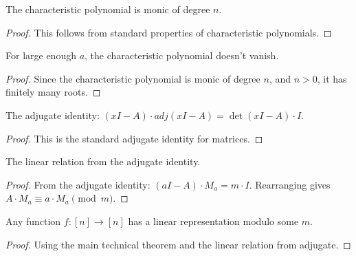 \begin{lemma}
\leanok
The characteristic polynomial is monic of degree $n$.
\end{lemma}

\begin{proof}
This follows from standard properties of characteristic polynomials.
\end{proof}

\begin{lemma}
For large enough $a$, the characteristic polynomial doesn't vanish.
\end{lemma}

\begin{proof}
Since the characteristic polynomial is monic of degree $n$, and $n > 0$, it has finitely many roots.
\end{proof}

\begin{lemma}
The adjugate identity: $(xI - A) \cdot adj(xI - A) = \det(xI - A) \cdot I$.
\end{lemma}

\begin{proof}
This is the standard adjugate identity for matrices.
\end{proof}

\begin{lemma}
The linear relation from the adjugate identity.
\end{lemma}

\begin{proof}
From the adjugate identity: $(aI - A) \cdot M_a = m \cdot I$.
Rearranging gives $A \cdot M_a \equiv a \cdot M_a \pmod{m}$.
\end{proof}

\begin{theorem}
Any function $f: [n] \to [n]$ has a linear representation modulo some $m$.
\end{theorem}

\begin{proof}
Using the main technical theorem and the linear relation from adjugate.
\end{proof}


